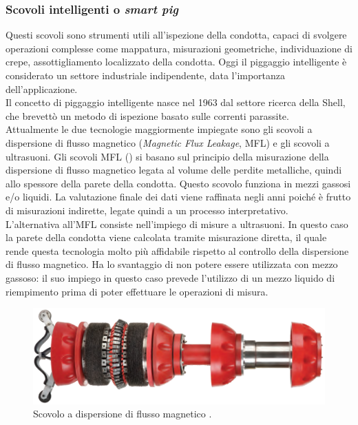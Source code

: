 \subsubsection*{Scovoli intelligenti o \textit{smart pig}}
Questi scovoli sono strumenti utili all'ispezione della condotta, capaci di svolgere operazioni complesse come mappatura, misurazioni geometriche, individuazione di crepe, assottigliamento localizzato della condotta. Oggi il piggaggio intelligente è considerato un settore industriale indipendente, data l'importanza dell'applicazione.\\
Il concetto di piggaggio intelligente nasce nel 1963 dal settore ricerca della Shell, che brevettò un metodo di ispezione basato sulle correnti parassite.\\
Attualmente le due tecnologie maggiormente impiegate sono gli scovoli a dispersione di flusso magnetico (\textit{Magnetic Flux Leakage}, MFL) e gli scovoli a ultrasuoni.
Gli scovoli MFL () si basano sul principio della misurazione della dispersione di flusso magnetico legata al volume delle perdite metalliche, quindi allo spessore della parete della condotta. Questo scovolo funziona in mezzi gassosi e/o liquidi. La valutazione finale dei dati viene raffinata negli anni poiché è frutto di misurazioni indirette, legate quindi a un processo interpretativo.\\
L'alternativa all'MFL consiste nell'impiego di misure a ultrasuoni. In questo caso la parete della condotta viene calcolata tramite misurazione diretta, il quale rende questa tecnologia molto più affidabile rispetto al controllo della dispersione di flusso magnetico. Ha lo svantaggio di non potere essere utilizzata con mezzo gassoso: il suo impiego in questo caso prevede l'utilizzo di un mezzo liquido di riempimento prima di poter effettuare le operazioni di misura.

\begin{figure}[htbp]
	\centering
	\includegraphics[width=.6\textwidth]{fig/pig/smartpig}
	\caption{Scovolo a dispersione di flusso magnetico \parencite{williamson2015guide}.}
	\label{fig:smartpig}
\end{figure}

